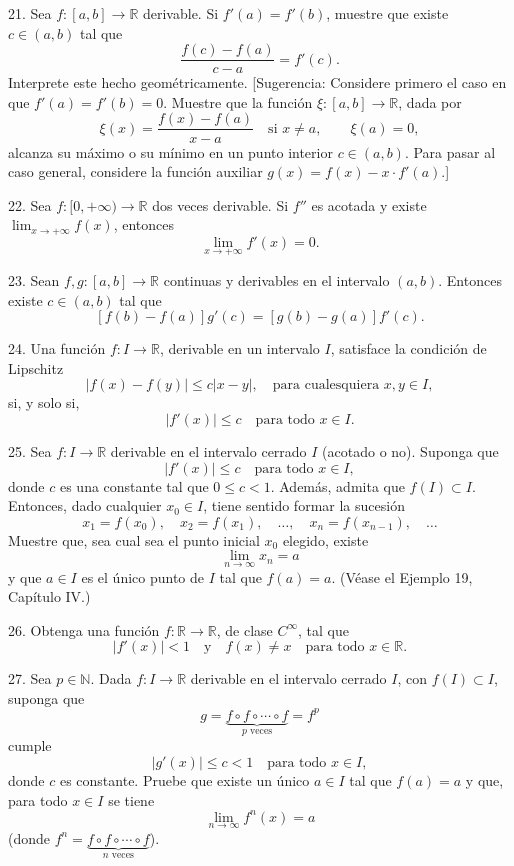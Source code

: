 \documentclass[12pt,oneside]{book}
\begin{document}
21. Sea \( f: [a, b] \to \mathbb{R} \) derivable. Si \( f'(a) = f'(b) \), muestre que existe \( c \in (a, b) \) tal que
\[
\frac{f(c) - f(a)}{c - a} = f'(c).
\]
Interprete este hecho geométricamente. [Sugerencia: Considere primero el caso en que \( f'(a) = f'(b) = 0 \). Muestre que la función \( \xi: [a, b] \to \mathbb{R} \), dada por
\[
\xi(x) = \frac{f(x) - f(a)}{x - a} \quad \text{si } x \neq a, \qquad \xi(a) = 0,
\]
alcanza su máximo o su mínimo en un punto interior \( c \in (a, b) \). Para pasar al caso general, considere la función auxiliar \( g(x) = f(x) - x \cdot f'(a) \).]

22. Sea \( f: [0, +\infty) \to \mathbb{R} \) dos veces derivable. Si \( f'' \) es acotada y existe \( \lim_{x \to +\infty} f(x) \), entonces
\[
\lim_{x \to +\infty} f'(x) = 0.
\]

23. Sean \( f, g: [a, b] \to \mathbb{R} \) continuas y derivables en el intervalo \( (a, b) \). Entonces existe \( c \in (a, b) \) tal que
\[
[f(b) - f(a)]g'(c) = [g(b) - g(a)]f'(c).
\]

24. Una función \( f: I \to \mathbb{R} \), derivable en un intervalo \( I \), satisface la condición de Lipschitz
\[
|f(x) - f(y)| \leq c|x - y|, \quad \text{para cualesquiera } x, y \in I,
\]
si, y solo si,
\[
|f'(x)| \leq c \quad \text{para todo } x \in I.
\]

25. Sea \( f: I \to \mathbb{R} \) derivable en el intervalo cerrado \( I \) (acotado o no). Suponga que
\[
|f'(x)| \leq c \quad \text{para todo } x \in I,
\]
donde \( c \) es una constante tal que \( 0 \leq c < 1 \). Además, admita que \( f(I) \subset I \). Entonces, dado cualquier \( x_0 \in I \), tiene sentido formar la sucesión
\[
x_1 = f(x_0), \quad x_2 = f(x_1), \quad \dots, \quad x_n = f(x_{n-1}), \quad \dots
\]
Muestre que, sea cual sea el punto inicial \( x_0 \) elegido, existe
\[
\lim_{n \to \infty} x_n = a
\]
y que \( a \in I \) es el único punto de \( I \) tal que \( f(a) = a \). (Véase el Ejemplo 19, Capítulo IV.)

26. Obtenga una función \( f: \mathbb{R} \to \mathbb{R} \), de clase \( C^\infty \), tal que
\[
|f'(x)| < 1 \quad \text{y} \quad f(x) \neq x \quad \text{para todo } x \in \mathbb{R}.
\]

27. Sea \( p \in \mathbb{N} \). Dada \( f: I \to \mathbb{R} \) derivable en el intervalo cerrado \( I \), con \( f(I) \subset I \), suponga que
\[
g = \underbrace{f \circ f \circ \cdots \circ f}_{p \text{ veces}} = f^p
\]
cumple
\[
|g'(x)| \leq c < 1 \quad \text{para todo } x \in I,
\]
donde \( c \) es constante. Pruebe que existe un único \( a \in I \) tal que \( f(a) = a \) y que, para todo \( x \in I \) se tiene
\[
\lim_{n \to \infty} f^n(x) = a
\]
(donde \( f^n = \underbrace{f \circ f \circ \cdots \circ f}_{n \text{ veces}} \)).
\end{document}
